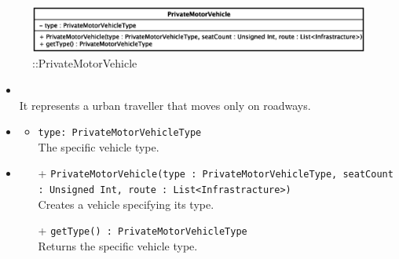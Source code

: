 \begin{figure}[h]
\centering
\includegraphics[scale=0.6,keepaspectratio]{images/solution/app/backend/private_motor_vehicle.eps}
\caption{\pActive::PrivateMotorVehicle}
\label{fig:sd-app-private-motor-vehicle}
\end{figure}
\FloatBarrier
\begin{itemize}
  \item \textbf{\descr} \\
It represents a urban traveller that moves only on roadways.
  \item \textbf{\attrs}
  \begin{itemize}
    \item \texttt{type: PrivateMotorVehicleType} \\
    The specific vehicle type.
  \end{itemize}
  \item \textbf{\ops}
  \begin{itemize}
  \item[+] \texttt{PrivateMotorVehicle(type : PrivateMotorVehicleType, seatCount : Unsigned Int, route : List<Infrastracture>)} \\
Creates a vehicle specifying its type.
    \item[+] \texttt{getType() : PrivateMotorVehicleType} \\
Returns the specific vehicle type.
  \end{itemize}
\end{itemize} 

